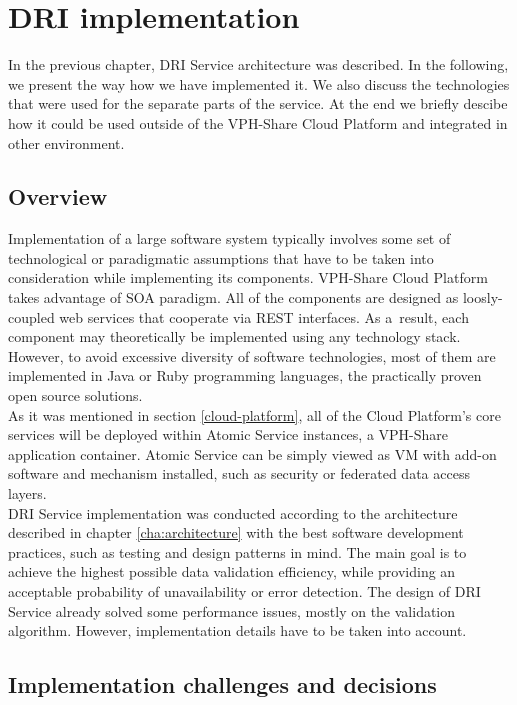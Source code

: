 \chapter{DRI implementation}
\label{cha:implementation}
In the previous chapter, DRI Service architecture was described. In the
following, we present the way how we have implemented it. We also
discuss the technologies that were used for the separate parts of the service.
At the end we briefly descibe how it could be used outside of the VPH-Share
Cloud Platform and integrated in other environment.


\section{Overview}
Implementation of a large software system typically involves some set of
technological or paradigmatic assumptions that have to be taken into
consideration while implementing its components. VPH-Share Cloud Platform takes
advantage of SOA paradigm. All of the components are designed as loosly-coupled web
services that cooperate via REST interfaces. As a~result, each component may
theoretically be implemented using any technology stack. However, to avoid
excessive diversity of software technologies, most of them are implemented in
Java or Ruby programming languages, the practically proven open source
solutions.\\

As it was mentioned in section \ref{cloud-platform}, all of the Cloud
Platform's core services will be deployed within Atomic Service instances,
a VPH-Share application container. Atomic Service can be simply viewed as VM
with add-on software and mechanism installed, such as security or federated
data access layers.\\

DRI Service implementation was conducted according to the architecture
described in chapter \ref{cha:architecture} with the best software development
practices, such as testing and design patterns in mind. The main goal is to
achieve the highest possible data validation efficiency, while providing an
acceptable probability of unavailability or error detection. The design of DRI
Service already solved some performance issues, mostly on the validation
algorithm. However, implementation details have to be taken into account.
	
\section{Implementation challenges and decisions}

